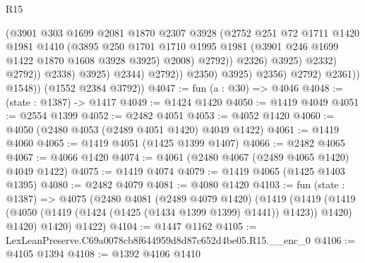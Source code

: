 \begin{lexlean}{R15}
\begin{coremodule}
                                          (@3901
                                            @303
                                            @1699
                                            @2081
                                            @1870
                                            @2307
                                            @3928
                                            (@2752
                                              @251
                                              @72
                                              @1711
                                              @1420
                                              @1981
                                              @1410
                                              (@3895
                                                @250
                                                @1701
                                                @1710
                                                @1995
                                                @1981
                                                (@3901 @246 @1699 @1422 @1870 @1608 @3928 @3925)
                                                @2008)
                                              @2792))
                                          @2326)
                                        @3925)
                                      @2332)
                                    @2792))
                                @2338)
                              @3925)
                            @2344)
                          @2792))
                      @2350)
                    @3925)
                  @2356)
                @2792)
              @2361))
          @1548))
      (@1552 @2384 @3792))
@4047 := fun (a : @30) => @4046
@4048 := (state : @1387) -> @1417
@4049 := @1424 @1420
@4050 := @1419 @4049
@4051 := @2554 @1399
@4052 := @2482 @4051
@4053 := @4052 @1420
@4060 := @4050 (@2480 @4053 (@2489 @4051 @1420) @4049 @1422)
@4061 := @1419 @4060
@4065 := @1419 @4051 (@1425 @1399 @1407)
@4066 := @2482 @4065
@4067 := @4066 @1420
@4074 := @4061 (@2480 @4067 (@2489 @4065 @1420) @4049 @1422)
@4075 := @1419 @4074
@4079 := @1419 @4065 (@1425 @1403 @1395)
@4080 := @2482 @4079
@4081 := @4080 @1420
@4103 := fun (state : @1387) =>
  @4075
    (@2480
      @4081
      (@2489 @4079 @1420)
      (@1419
        (@1419 (@1419 (@4050 (@1419 (@1424 (@1425 (@1434 @1399 @1399) @1441)) @1423)) @1420) @1420)
        @1420)
      @1422)
@4104 := @1447 @1162
@4105 := LexLeanPreserve.C69a0078cb8f644959d8d87c652d4be05.R15.__enc_0
@4106 := @4105 @1394
@4108 := @1392 @4106 @1410

\end{coremodule}
\end{lexlean}
